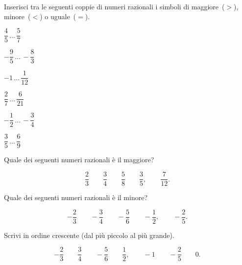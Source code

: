\subsubsection*{}

\begin{esercizio}
 \label{ese:3.29}
Inserisci tra le seguenti coppie di numeri razionali i simboli di 
maggiore~(\(>\)), minore~(\(<\)) o uguale~(\(=\)).
\begin{multicols}{3}
\begin{enumeratea}
\spazielenx
 \item \(\dfrac{4}{5}\,\ldots\,\dfrac{5}{7}\)
 \item \(-\dfrac{9}{5}\,\ldots\,-\dfrac{8}{3}\)
 \item \(-1\,\ldots\,\dfrac{1}{12}\)
 \item \(\dfrac{2}{7}\,\ldots\,\dfrac{6}{21}\)
 \item \(-\dfrac{1}{2}\,\ldots\,-\dfrac{3}{4}\)
 \item \(\dfrac{3}{5}\,\ldots\,\dfrac{6}{9}\)
\end{enumeratea}
\end{multicols}
\end{esercizio}

\begin{esercizio}
 \label{ese:3.30}
Quale dei seguenti numeri razionali è il maggiore?

\[\frac{2}{3} \qquad \frac{3}{4} \qquad \frac{5}{8} \qquad \frac{3}{5},
\qquad\frac{7}{12}.\]
\end{esercizio}


\begin{esercizio}
 \label{ese:3.31}
Quale dei seguenti numeri razionali è il minore?

\[-\frac{2}{3} \qquad -\frac{3}{4} \qquad -\frac{5}{6} \qquad -\frac{1}{2},
\qquad-\frac{2}{5}.\]
\end{esercizio}

\begin{esercizio}
 \label{ese:3.32}
Scrivi in ordine crescente (dal più piccolo al più grande).

\[-\frac{2}{3} \qquad \frac{3}{4} \qquad -\frac{5}{6} \qquad \frac{1}{2},
\qquad-1 \qquad -\frac{2}{5} \qquad 0.\]
\end{esercizio}

